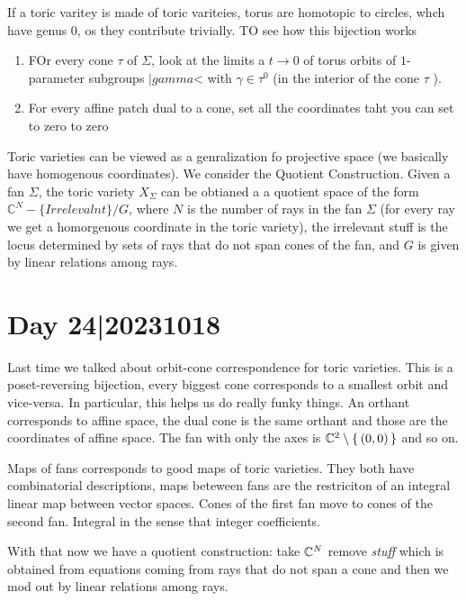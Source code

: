 \documentclass[12pt]{memoir}
\theoremstyle{definition}
\def\CC{{\mathbb C}}
\begin{document}
If a toric varitey is made of toric variteies, torus are homotopic to circles, whch have genus 0, os they contribute trivially.
TO see how this bijection works

\begin{enumerate}
    \item FOr every cone $\tau$ of $\Sigma$, look at the limits a $t \rightarrow 0$ of  torus orbits of $1$-parameter subgroups $|gamma$< with $\gamma \in \tau^0$ (in the interior of the cone $\tau$ ).
    \item For every affine patch dual to a cone, set all the coordinates taht you can set to zero to zero
\end{enumerate}



Toric varieties can be viewed as a genralization fo projective space (we basically have homogenous coordinates). We consider the Quotient Construction. Given a fan $\Sigma$, the toric variety $X_\Sigma$ can be obtianed a a quotient space of the form $\CC^{N}- \{Irrelevalnt\} / G$, where $N$ is the number of rays in the fan $\Sigma$ (for every ray we get a homorgenous coordinate in the toric variety), the irrelevant stuff is the locus determined by sets of rays that do not span cones of the fan, and $G$ is given by linear relations among rays.


\section{Day 24|20231018}

Last time we talked about orbit-cone correspondence for toric varieties. This is a poset-reversing bijection, every biggest cone corresponds to a smallest orbit and vice-versa. In particular, this helps us do really funky things. An orthant corresponds to affine space, the dual cone is the same orthant and those are the coordinates of affine space. The fan with only the axes is $\mathbb{C}^2\setminus\{\,(0,0)\,\}$ and so on.\par 
Maps of fans corresponds to good maps of toric varieties. They both have combinatorial descriptions, maps beteween fans are the restriciton of an integral linear map between vector spaces. Cones of the first fan move to cones of the second fan. Integral in the sense that integer coefficients.\par 
With that now we have a quotient construction: take $\mathbb{C}^N$ remove \emph{stuff} which is obtained from equations coming from rays that do not span a cone and then we mod out by linear relations among rays.
\end{document}
